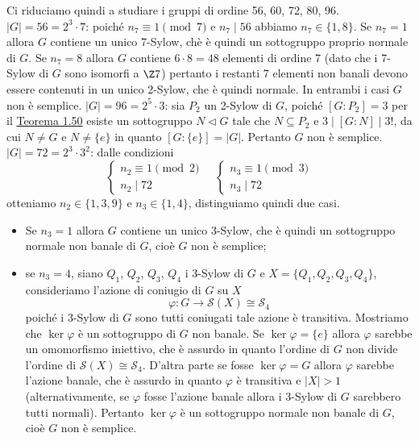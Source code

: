 \documentclass[11pt]{scrartcl}
\begin{document}
	Ci riduciamo quindi a studiare i gruppi di ordine 56, 60, 72, 80, 96.
	\newline\newline
	\underline{$|G| = 56 = 2^3\cdot 7$}: poiché $n_7 \equiv 1 \pmod 7$ e $n_7 \mid 56$ abbiamo
	$n_7 \in \{1, 8\}$. Se $n_7 = 1$ allora $G$ contiene un unico 7-Sylow, chè 
	è quindi un sottogruppo proprio normale di $G$. Se $n_7 = 8$ allora $G$ contiene
	$6\cdot8 = 48$ elementi di ordine 7 (dato che i 7-Sylow di $G$ sono isomorfi a $\Z7$)
	pertanto i restanti $7$ elementi non banali devono essere contenuti in un 
	unico 2-Sylow, che è quindi normale. In entrambi i casi $G$ non è semplice.
	\newline\newline
	\underline{$|G| = 96 = 2^5\cdot 3$}: sia $P_2$ un 2-Sylow di $G$, poiché 
	$[G:P_2] = 3$ per il \hyperref[teorema1.50]{Teorema 1.50} esiste un sottogruppo
	$N \triangleleft G$ tale che $N \subseteq P_2$ e $3 \mid [G:N] \mid 3!$, da cui
	$N \neq G$ e $N \neq \{e\}$ in quanto $[G:\{e\}] = |G|$. Pertanto $G$ non 
	è semplice.
	\newline\newline
	\underline{$|G| = 72 = 2^3 \cdot 3^2$}: dalle condizioni 
	\[
	\begin{cases}
		n_2 \equiv 1 \pmod 2\\
		n_2 \mid 72
	\end{cases}\quad
	\begin{cases}
		n_3 \equiv 1 \pmod 3\\
		n_3 \mid 72
	\end{cases}
	\]
	otteniamo $n_2 \in \{1, 3, 9\}$ e $n_3 \in \{1, 4\}$, distinguiamo quindi
	due casi.
	\begin{itemize}
		\item Se $n_3 = 1$ allora $G$ contiene un unico 3-Sylow, che è quindi un
		sottogruppo normale non banale di $G$, cioè $G$ non è semplice;
		\item se $n_3= 4$, siano $Q_1$, $Q_2$, $Q_3$, $Q_4$ i 3-Sylow di $G$ e 
		$X = \{Q_1, Q_2, Q_3, Q_4\}$, consideriamo l'azione di coniugio di $G$ su $X$
		\[
		\varphi: G\longrightarrow \mathcal{S}(X) \cong \mathcal{S}_4
		\]
		poiché i 3-Sylow di $G$ sono tutti coniugati tale azione è transitiva.
		Mostriamo che $\ker \varphi$ è un sottogruppo di $G$ non banale. Se $\ker\varphi
		= \{e\}$ allora $\varphi$ sarebbe un omomorfismo iniettivo, che è assurdo
		in quanto l'ordine di $G$ non divide l'ordine di $\mathcal{S}(X) \cong \mathcal{S}_4$. D'altra
		parte se fosse $\ker\varphi = G$ allora $\varphi$ sarebbe l'azione banale,
		che è assurdo in quanto $\varphi$ è transitiva e $|X| > 1$ (alternativamente,
		se $\varphi$ fosse l'azione banale allora i 3-Sylow di $G$ sarebbero tutti
		normali). Pertanto $\ker\varphi$ è un sottogruppo normale non banale di $G$,
		cioè $G$ non è semplice.
	\end{itemize}
\end{document}
